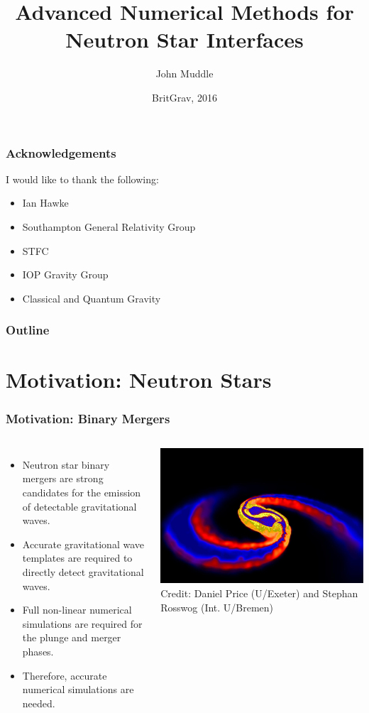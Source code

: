 \documentclass{beamer}
\title[Advanced Numerical Methods for Neutron Star Interfaces] %
{Advanced Numerical Methods for \\
Neutron Star Interfaces}
\subtitle{}
\author[John Muddle - @john$\_$muddle] %
{John Muddle}
\institute[University of Southampton] %
{
  School of Mathematics\\
  University of Southampton\\[1\baselineskip]
  Supervisor - Ian Hawke

}
\date[Britgrav 2016] %
{BritGrav, 2016}
\begin{document}
\begin{frame}
  \titlepage
\end{frame}
\begin{frame}
\frametitle{Acknowledgements}
I would like to thank the following:
\begin{itemize}
\item{Ian Hawke}
\item{Southampton General Relativity Group}
\item{STFC}
\item{IOP Gravity Group}
\item{Classical and Quantum Gravity}
\end{itemize}
\end{frame}
 \begin{frame}
   \frametitle{Outline}
   \tableofcontents
 \end{frame}
\section{Motivation: Neutron Stars}

\begin{frame}
\frametitle{Motivation: Binary Mergers}
\begin{columns}
\begin{itemize}
\item{Neutron star binary mergers are strong candidates for the emission of detectable gravitational waves.}
\item{Accurate gravitational wave templates are required to directly detect gravitational waves.}
\item{Full non-linear numerical simulations are required for the plunge and merger phases.}
\item{Therefore, accurate numerical simulations are needed.}
\end{itemize}
\includegraphics[width=\textwidth]{../images/price_rosswog_press_1}\\
\tiny Credit: Daniel Price (U/Exeter) and Stephan Rosswog (Int. U/Bremen)
\end{columns}
\end{frame}
\end{document}
